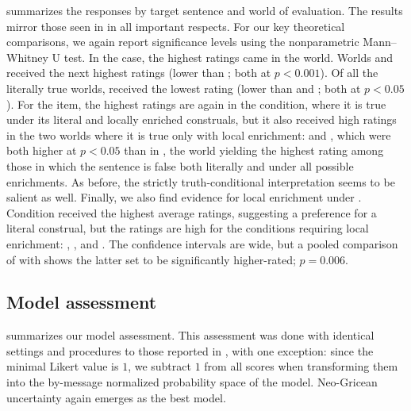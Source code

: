 \documentclass[leqno,12pt]{article}
\begin{document}
\begin{appendix}
 summarizes the responses by target sentence
and world of evaluation. The results mirror those
seen in  in all important respects.
%
For our key theoretical comparisons, we again report significance
levels using the nonparametric Mann--Whitney U test. In the
 case, the highest ratings came in the 
world. Worlds  and  received the next highest
ratings (lower than ; both at $p<0.001$). Of all the
literally true worlds,  received the lowest rating (lower
than  and ; both at $p<0.05$).
%
For the  item, the highest ratings are again
in the  condition, where it is true under its literal and
locally enriched construals, but it also received high ratings in the
two worlds where it is true only with local enrichment: 
and , which were both higher at $p<0.05$ than in
, the world yielding the highest rating among those in
which the sentence is false both literally and under all possible
enrichments. As before, the strictly truth-conditional interpretation
seems to be salient as well.
%
Finally, we also find evidence for local enrichment under
. Condition  received the highest average
ratings, suggesting a preference for a literal construal, but the
ratings are high for the conditions requiring local enrichment:
, , and . The confidence intervals
are wide, but a pooled comparison of 
with  shows the latter set to
be significantly higher-rated; $p = 0.006$.


\subsection{Model assessment}

 summarizes our model assessment. This
assessment was done with identical settings and procedures to those
reported in , with one exception: since the
minimal Likert value is $1$, we subtract $1$ from all scores when
transforming them into the by-message normalized probability space of
the model. Neo-Gricean uncertainty again emerges as the best model.


\end{appendix}
\end{document}
